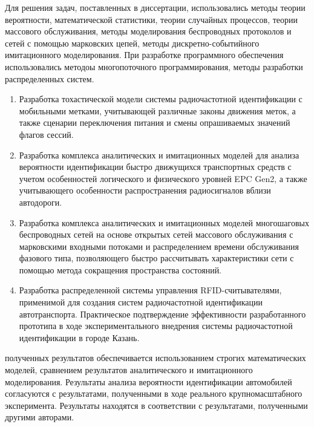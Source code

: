 {\methods} Для решения задач, поставленных в диссертации, использовались методы теории вероятности, математической статистики, теории случайных процессов, теории массового обслуживания, методы моделирования беспроводных протоколов и сетей с помощью марковских цепей, методы дискретно-событийного имитационного моделирования. При разработке программного обеспечения использовались методоы многопоточного программирования, методы разработки распределенных систем.

{}
\begin{enumerate}[beginpenalty=10000] %
  \item Разработка тохастической модели системы радиочастотной идентификации с мобильными метками, учитывающей различные законы движения меток, а также сценарии переключения питания и смены опрашиваемых значений флагов сессий.
  \item Разработка комплекса аналитических и имитационных моделей для анализа вероятности идентификации быстро движущихся транспортных средств с учетом особенностей логического и физического уровней EPC Gen2, а также учитывающего особенности распространения радиосигналов вблизи автодороги.
  \item Разработка комплекса аналитических и имитационных моделей многошаговых беспроводных сетей на основе открытых сетей массового обслуживания с марковскими входными потоками и распределением времени обслуживания фазового типа, позволяющего быстро рассчитывать характеристики сети с помощью метода сокращения пространства состояний.
  \item Разработка распределенной системы управления RFID-считывателями, применимой для создания систем радиочастотной идентификации автотранспорта. Практическое подтверждение эффективности разработанного прототипа в ходе экспериментального внедрения системы радиочастотной идентификации в городе Казань. 
\end{enumerate}

{\reliability} полученных результатов обеспечивается использованием строгих математических моделей, сравнением результатов аналитического и имитационного моделирования. Результаты анализа вероятности идентификации автомобилей согласуются с результатами, полученными в ходе реального крупномасштабного эксперимента. Результаты находятся в соответствии с результатами, полученными другими авторами.


